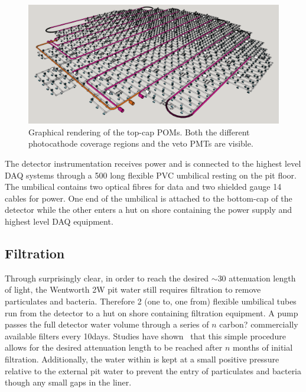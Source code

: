 \begin{figure} %
    \includegraphics[width=\textwidth]{diagrams/4-chips/top_cap.png}
    \caption[Graphical rendering of the top-cap POMs.]
    {Graphical rendering of the top-cap POMs. Both the different photocathode coverage regions and
        the veto PMTs are visible.}
    \label{fig:top_cap}
\end{figure}

The detector instrumentation receives power and is connected to the highest level DAQ systems
through a \unit{500}{} long flexible PVC umbilical resting on the pit floor. The
umbilical contains two optical fibres for data and two shielded gauge 14 cables for power. One end
of the umbilical is attached to the bottom-cap of the detector while the other enters a hut on
shore containing the power supply and highest level DAQ equipment.

\subsection{Filtration} %
\label{sec:chips_detector_water} %

Through surprisingly clear, in order to reach the desired $\sim$\unit{30}{} attenuation
length of light, the Wentworth 2W pit water still requires filtration to remove particulates and
bacteria. Therefore 2 (one to, one from) flexible umbilical tubes run from the detector to a hut
on shore containing filtration equipment. A pump passes the full detector water volume through a
series of $n$ carbon? commercially available filters every \unit{10}{days}. Studies have
shown~\cite{campbell2020} that this simple procedure allows for the desired attenuation length to
be reached after $n$ months of initial filtration. Additionally, the water within \chipsfive is
kept at a small positive pressure relative to the external pit water to prevent the entry of
particulates and bacteria though any small gaps in the liner.

